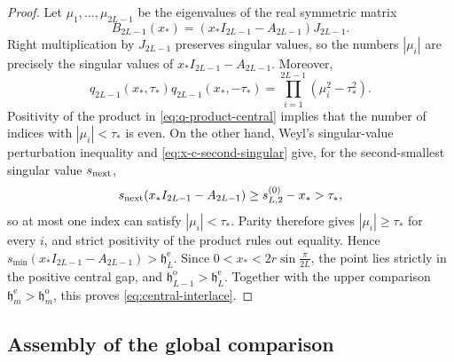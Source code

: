 \documentclass[preprints,article,accept,oneauthor]{Definitions/mdpi}
\numberwithin{equation}{section}
\theoremstyle{mdpi}
\theoremstyle{definition}
\begin{document}
\begin{proof}
Let \(\mu_1,\ldots,\mu_{2L-1}\) be the eigenvalues of the real symmetric
matrix
\[
 B_{2L-1}(x_*)=(x_*I_{2L-1}-A_{2L-1})J_{2L-1}.
\]
Right multiplication by \(J_{2L-1}\) preserves singular values, so the
numbers \(|\mu_i|\) are precisely the singular values of
\(x_*I_{2L-1}-A_{2L-1}\).  Moreover,
\[
 q_{2L-1}(x_*,\tau_*)q_{2L-1}(x_*,-\tau_*)
 =\prod_{i=1}^{2L-1}(\mu_i^2-\tau_*^2).
\]
Positivity of the product in \eqref{eq:q-product-central} implies that the
number of indices with \(|\mu_i|<\tau_*\) is even.  On the other hand, Weyl's
singular-value perturbation inequality and
\eqref{eq:x-c-second-singular} give, for the second-smallest singular value
\(s_{\rm next}\),
\[
 s_{\rm next}(x_*I_{2L-1}-A_{2L-1})
 \geq s_{L,2}^{(0)}-x_*>\tau_*,
\]
so at most one index can satisfy \(|\mu_i|<\tau_*\).  Parity therefore gives
\(|\mu_i|\geq\tau_*\) for every \(i\), and strict positivity of the product
rules out equality.  Hence
\(s_{\min}(x_*I_{2L-1}-A_{2L-1})>\mathfrak h_L^{\mathrm e}\).  Since
\(0<x_*<2r\sin\frac{\pi}{2L}\), the point lies strictly in the positive
central gap, and
\(\mathfrak h_{L-1}^{\mathrm o}>\mathfrak h_L^{\mathrm e}\).  Together
with the upper comparison
\(\mathfrak h_m^{\mathrm e}>\mathfrak h_m^{\mathrm o}\), this proves
\eqref{eq:central-interlace}.
\end{proof}

\subsection{Assembly of the global comparison}
\label{subsec:global-comparison}
\end{document}
